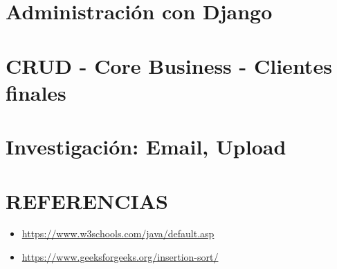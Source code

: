 \documentclass{article}
\begin{document}
	\section{Administración con Django}
		
		
	
	\section{CRUD - Core Business - Clientes finales}
	\section{Investigación: Email, Upload}
	
	\section{REFERENCIAS}
	
	\begin{itemize}			
		\item \url{https://www.w3schools.com/java/default.asp}
		\item \url{https://www.geeksforgeeks.org/insertion-sort/}
	\end{itemize}	
	
%
%
%
			
\end{document}
